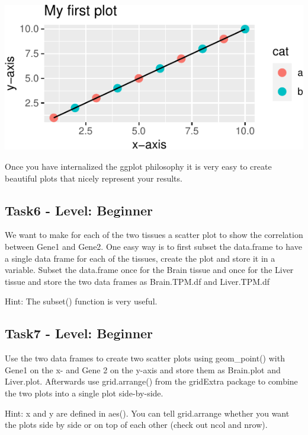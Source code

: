 \documentclass[
  7pt,
]{article}
\begin{document}
\begin{center}\includegraphics{dplyr_tidyr_ggplot2_files/figure-latex/ggplot_example-1} \end{center}

Once you have internalized the ggplot philosophy it is very easy to
create beautiful plots that nicely represent your results.

\hypertarget{task6---level-beginner}{%
\subsection{Task6 - Level: Beginner}\label{task6---level-beginner}}

We want to make for each of the two tissues a scatter plot to show the
correlation between Gene1 and Gene2. One easy way is to first subset the
data.frame to have a single data frame for each of the tissues, create
the plot and store it in a variable. Subset the data.frame once for the
Brain tissue and once for the Liver tissue and store the two data frames
as Brain.TPM.df and Liver.TPM.df

Hint: The subset() function is very useful.

\pagebreak

\hypertarget{task7---level-beginner}{%
\subsection{Task7 - Level: Beginner}\label{task7---level-beginner}}

Use the two data frames to create two scatter plots using geom\_point()
with Gene1 on the x- and Gene 2 on the y-axis and store them as
Brain.plot and Liver.plot. Afterwards use grid.arrange() from the
gridExtra package to combine the two plots into a single plot
side-by-side.

Hint: x and y are defined in aes(). You can tell grid.arrange whether
you want the plots side by side or on top of each other (check out ncol
and nrow).
\end{document}
